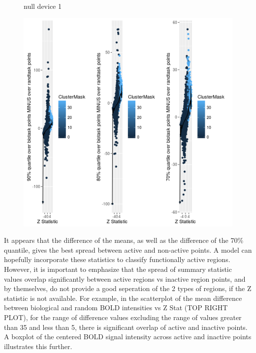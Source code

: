 \documentclass{report}
\begin{document}
\begin{figure}
\label{fig:figure4}
\begin{Schunk}
\begin{Soutput}
null device 
          1 
\end{Soutput}
\end{Schunk}
\includegraphics[width=\textwidth,keepaspectratio]{fig4}
\end{figure}

It appears that the difference of the means, as well as the difference of the 70\% quantile, gives the best spread between active and non-active points. A model can hopefully incorporate these statistics to classify functionally active regions. However, it is important to emphasize that the spread of summary statistic values overlap significantly between active regions vs inactive region points, and by themselves, do not provide a good seperation of the 2 types of regions, if the Z statistic is not available. For example, in the scatterplot of the mean difference between biological and random BOLD intensities vs Z Stat (TOP RIGHT PLOT), for the range of difference values excluding the range of values greater than 35 and less than 5, there is significant overlap of active and inactive points. A boxplot of the centered BOLD signal intensity across active and inactive points illustrates this further.
\end{document}
